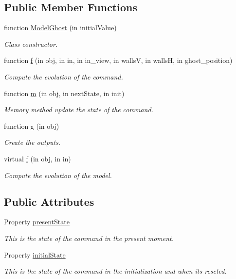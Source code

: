 \subsection*{Public Member Functions}
\begin{DoxyCompactItemize}
\item 
function \hyperlink{class_model_ghost_a0eb9a8f9771bba8a091d35339af59343}{Model\+Ghost} (in initial\+Value)
\begin{DoxyCompactList}\small\item\em Class constructor. \end{DoxyCompactList}\item 
function \hyperlink{class_model_ghost_a3643512eacb95c58d0678b6a76176101}{f} (in obj, in in, in in\+\_\+view, in wallsV, in wallsH, in ghost\+\_\+position)
\begin{DoxyCompactList}\small\item\em Compute the evolution of the command. \end{DoxyCompactList}\item 
function \hyperlink{class_model_ghost_a3140f24c6c4b80037b7d4f521c6ae2d3}{m} (in obj, in next\+State, in init)
\begin{DoxyCompactList}\small\item\em Memory method update the state of the command. \end{DoxyCompactList}\item 
function \hyperlink{class_model_ghost_a07dadfabe92bf9a144b8a862720e7746}{g} (in obj)
\begin{DoxyCompactList}\small\item\em Create the outputs. \end{DoxyCompactList}\item 
virtual \hyperlink{class_model_s_e_d_ac36f9451c43b120828af4380858f2024}{f} (in obj, in in)
\begin{DoxyCompactList}\small\item\em Compute the evolution of the model. \end{DoxyCompactList}\end{DoxyCompactItemize}
\subsection*{Public Attributes}
\begin{DoxyCompactItemize}
\item 
Property \hyperlink{class_model_ghost_a9624cc7c421a50fa5086b0ebd0cd5fe3}{present\+State}
\begin{DoxyCompactList}\small\item\em This is the state of the command in the present moment. \end{DoxyCompactList}\item 
Property \hyperlink{class_model_ghost_acd9263acfa96c9138afdf497e55acc24}{initial\+State}
\begin{DoxyCompactList}\small\item\em This is the state of the command in the initialization and when it\textquotesingle{}s reseted. \end{DoxyCompactList}\end{DoxyCompactItemize}


